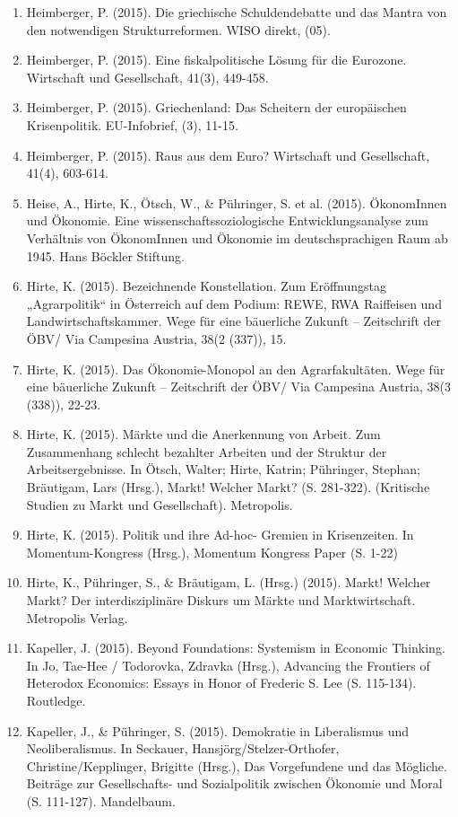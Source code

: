 \begin{enumerate}
	 \item Heimberger, P. (2015). Die griechische Schuldendebatte und das Mantra von den \glqq notwendigen Strukturreformen\grqq{}. WISO direkt, (05).
	 \item Heimberger, P. (2015). Eine fiskalpolitische Lösung für die Eurozone. Wirtschaft und Gesellschaft, 41(3), 449-458.
	 \item Heimberger, P. (2015). Griechenland: Das Scheitern der europäischen Krisenpolitik. EU-Infobrief, (3), 11-15.
	 \item Heimberger, P. (2015). Raus aus dem Euro? Wirtschaft und Gesellschaft, 41(4), 603-614.
	 \item Heise, A., Hirte, K., Ötsch, W., \& Pühringer, S. et al. (2015). ÖkonomInnen und Ökonomie. Eine wissenschaftssoziologische Entwicklungsanalyse zum Verhältnis von ÖkonomInnen und Ökonomie im deutschsprachigen Raum ab 1945. Hans Böckler Stiftung.
	 \item Hirte, K. (2015). Bezeichnende Konstellation. Zum Eröffnungstag „Agrarpolitik“ in Österreich auf dem Podium: REWE, RWA Raiffeisen und Landwirtschaftskammer. Wege für eine bäuerliche Zukunft – Zeitschrift der ÖBV/ Via Campesina Austria, 38(2 (337)), 15.
	 \item Hirte, K. (2015). Das Ökonomie-Monopol an den Agrarfakultäten. Wege für eine bäuerliche Zukunft – Zeitschrift der ÖBV/ Via Campesina Austria, 38(3 (338)), 22-23.
	 \item Hirte, K. (2015). Märkte und die Anerkennung von Arbeit. Zum Zusammenhang schlecht bezahlter Arbeiten und der Struktur der Arbeitsergebnisse. In Ötsch, Walter; Hirte, Katrin; Pühringer, Stephan; Bräutigam, Lars (Hrsg.), Markt! Welcher Markt? (S. 281-322). (Kritische Studien zu Markt und Gesellschaft). Metropolis.
	 \item Hirte, K. (2015). Politik und ihre Ad-hoc- Gremien in Krisenzeiten. In Momentum-Kongress (Hrsg.), Momentum Kongress Paper (S. 1-22)
	 \item Hirte, K., Pühringer, S., \& Bräutigam, L. (Hrsg.) (2015). Markt! Welcher Markt? Der interdisziplinäre Diskurs um Märkte und Marktwirtschaft. Metropolis Verlag.
	 \item Kapeller, J. (2015). Beyond Foundations: Systemism in Economic Thinking. In Jo, Tae-Hee / Todorovka, Zdravka (Hrsg.), Advancing the Frontiers of Heterodox Economics: Essays in Honor of Frederic S. Lee (S. 115-134). Routledge.
	 \item Kapeller, J., \& Pühringer, S. (2015). Demokratie in Liberalismus und Neoliberalismus. In Seckauer, Hansjörg/Stelzer-Orthofer, Christine/Kepplinger, Brigitte (Hrsg.), Das Vorgefundene und das Mögliche. Beiträge zur Gesellschafts- und Sozialpolitik zwischen Ökonomie und Moral (S. 111-127). Mandelbaum.

\end{enumerate}
